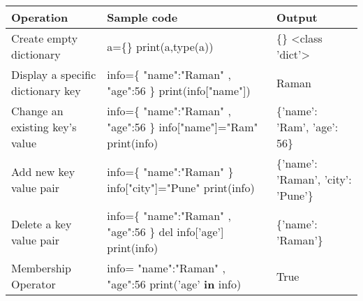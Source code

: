 

\begin{flushleft}

	
	\begin{tabulary}{1.0\textwidth}{|p{7em}|p{12em}|p{7em}|}

		\toprule

		\textbf{Operation} & \textbf{Sample code}  & \textbf{Output} \\

		\midrule

		Create empty dictionary & a=\{\} \newline print(a,type(a)) & \{\} <class 'dict'> \\

		\hline

		Display a specific dictionary key & info=\{ "name":"Raman" , "age":56  \} \newline print(info["name"]) & Raman \\

		\hline

		Change an existing key's value & info=\{ "name":"Raman" , "age":56  \} \newline info["name"]="Ram" \newline print(info) & \{'name': 'Ram', 'age': 56\} \\

		\hline

		Add new key value pair & info=\{ "name":"Raman" \} \newline info["city"]="Pune" \newline print(info) & \{'name': 'Raman', 'city': 'Pune'\} \\
		\hline
		Delete a key value pair & info=\{ "name":"Raman" , "age":56 \}  \newline
		del info['age'] \newline print(info) & \{'name': 'Raman'\} \\

		\hline
		Membership Operator & info={ "name":"Raman" , "age":56  } \newline
		print('age' \textbf{in} info) & True \\

		\bottomrule

	\end{tabulary}

	
	
\end{flushleft}

\newpage

